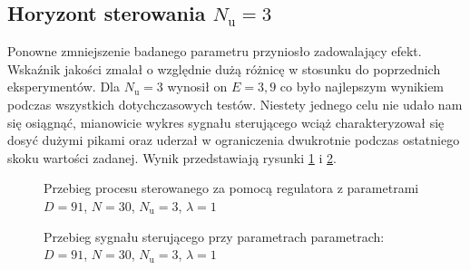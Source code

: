 \subsection{Horyzont sterowania $N_{\mathrm{u}} = 3$}
Ponowne zmniejszenie badanego parametru przyniosło zadowalający efekt. Wskaźnik jakości zmalał o względnie dużą różnicę w stosunku do poprzednich eksperymentów. Dla $N_{\mathrm{u}} = 3$ wynosił on $E = 3,9$ co było najlepszym wynikiem podczas wszystkich dotychczasowych testów. Niestety jednego celu nie udało nam się osiągnąć, mianowicie wykres sygnału sterującego wciąż charakteryzował się dosyć dużymi pikami oraz uderzał w ograniczenia dwukrotnie podczas ostatniego skoku wartości zadanej. Wynik przedstawiają rysunki \ref{dmc_Nu_3_y} i \ref{dmc_Nu_3_u}.

\begin{figure}[b]
    \centering
    \caption{Przebieg procesu sterowanego za pomocą regulatora z parametrami $D = 91$, $N = 30$, $N_{\mathrm{u}} = 3$, $\lambda = 1$}
    \label{dmc_Nu_3_y}
\end{figure}

\begin{figure}[b]
    \centering
    \caption{Przebieg sygnału sterującego przy parametrach parametrach: $D = 91$, $N = 30$, $N_{\mathrm{u}} = 3$, $\lambda = 1$}
    \label{dmc_Nu_3_u}
\end{figure}

